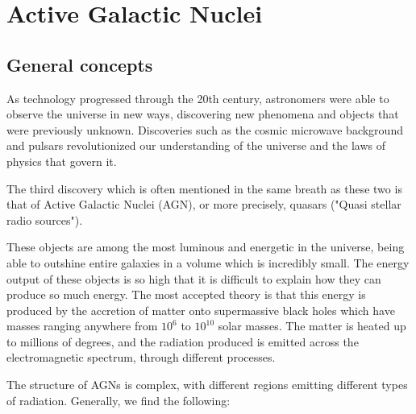 \chapter{Active Galactic Nuclei}
\label{chap:Background}
\section{General concepts}
As technology progressed through the 20th century, astronomers were able to observe the universe in new ways, discovering new phenomena and objects that were previously unknown. Discoveries such as the cosmic microwave background and pulsars revolutionized our understanding of the universe and the laws of physics that govern it.

The third discovery which is often mentioned in the same breath as these two is that of Active Galactic Nuclei (AGN), or more precisely, quasars ("Quasi stellar radio sources").

These objects are among the most luminous and energetic in the universe, being able to outshine entire galaxies in a volume which is incredibly small. The energy output of these objects is so high that it is difficult to explain how they can produce so much energy. The most accepted theory is that this energy is produced by the accretion of matter onto supermassive black holes which have masses ranging anywhere from $10^6$ to $10^10$ solar masses. The matter is heated up to millions of degrees, and the radiation produced is emitted across the electromagnetic spectrum, through different processes.

The structure of AGNs is complex, with different regions emitting different types of radiation. Generally, we find the following:

